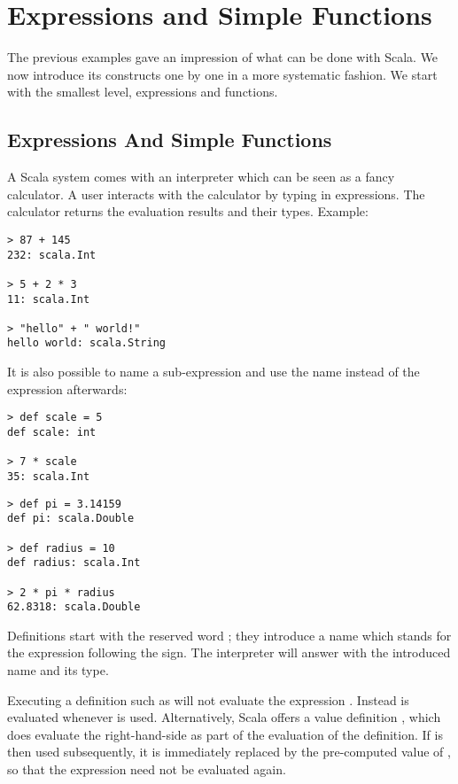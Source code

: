 \chapter{\label{chap:simple-funs}Expressions and Simple Functions}

The previous examples gave an impression of what can be done with
Scala.  We now introduce its constructs one by one in a more
systematic fashion. We start with the smallest level, expressions and
functions.

\section{Expressions And Simple Functions}

A Scala system comes with an interpreter which can be seen as a fancy
calculator. A user interacts with the calculator by typing in
expressions. The calculator returns the evaluation results and their
types. Example:

\begin{lstlisting}
> 87 + 145
232: scala.Int

> 5 + 2 * 3
11: scala.Int

> "hello" + " world!"
hello world: scala.String
\end{lstlisting}
It is also possible to name a sub-expression and use the name instead
of the expression afterwards:
\begin{lstlisting}
> def scale = 5
def scale: int

> 7 * scale
35: scala.Int
\end{lstlisting}
\begin{lstlisting}
> def pi = 3.14159
def pi: scala.Double

> def radius = 10
def radius: scala.Int

> 2 * pi * radius
62.8318: scala.Double
\end{lstlisting}
Definitions start with the reserved word ; they introduce a
name which stands for the expression following the \code{=} sign.  The
interpreter will answer with the introduced name and its type.

Executing a definition such as  will not evaluate the
expression .  Instead  is evaluated whenever 
is used. Alternatively, Scala offers a value definition 
, which does evaluate the right-hand-side  as part of the
evaluation of the definition. If  is then used subsequently,
it is immediately replaced by the pre-computed value of
, so that the expression need not be evaluated again.
 
